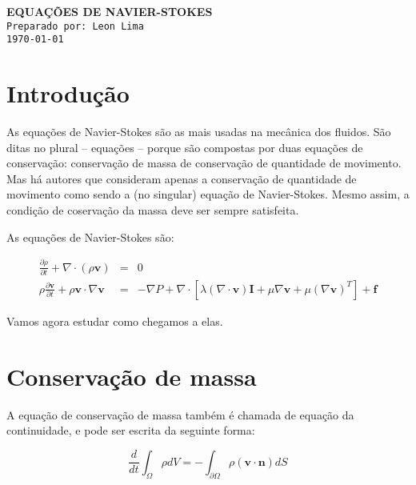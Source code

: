 \documentclass[a4paper,portuguese,10pt]{article}
\renewcommand{\div}{\nabla\cdot}
\newcommand{\grad}{\nabla}
\renewcommand{\D}{\partial}
\renewcommand{\vec}{\mathbf}
\begin{document}
\thispagestyle{empty}



\Large \color{NavyBlue} \textbf{EQUAÇÕES DE NAVIER-STOKES}\\
\color{Black} %
\normalsize \texttt{Preparado por: Leon Lima}\\%
\normalsize \texttt{\today}
\vspace{-2mm}

\setcounter{tocdepth}{1}

\hrulefill
\vspace*{-5mm}
\tableofcontents
\hrulefill

\section{Introdução}

As equações de Navier-Stokes são as mais usadas na mecânica dos fluidos. São ditas no plural -- equações -- porque são compostas por duas equações de conservação: conservação de massa de conservação de quantidade de movimento. Mas há autores que consideram apenas a conservação de quantidade de movimento como sendo a (no singular) equação de Navier-Stokes. Mesmo assim, a condição de coservação da massa deve ser sempre satisfeita. 

As equações de Navier-Stokes são:

\begin{subequations}
\begin{eqnarray}
  \frac{\D\rho}{\D t} + \div(\rho\vec{v}) &=& 0\\
  \rho\frac{\D\vec{v}}{\D t}+\rho\vec{v}\cdot\grad\vec{v} &=& -\grad P + \div[\lambda(\div\vec{v})\vec{I} + \mu\grad\vec{v}+\mu(\grad\vec{v})^T] + \vec{f}
\end{eqnarray}
\end{subequations}

Vamos agora estudar como chegamos a elas.

\section{Conservação de massa}

A equação de conservação de massa também é chamada de equação da continuidade, e pode ser escrita da seguinte forma:

\begin{equation}
  \frac{d}{dt}\int_{\Omega}\rho dV = -\int_{\D\Omega}\rho(\vec{v}\cdot\vec{n})dS
  \label{cont_int}
\end{equation}
\end{document}
